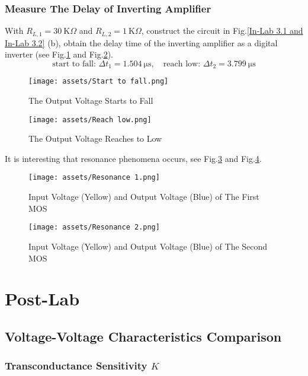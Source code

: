 \documentclass[UTF8]{report}
\def\KO{\ \mathrm{K}\Omega}
\theoremstyle{MyLineTheoremStyle} %
\theoremstyle{MyBlockTheoremStyle} %
\theoremstyle{MySubsubsectionStyle} %
\begin{document}
\subsubsection{Measure The Delay of Inverting Amplifier}
With $R_{L, 1} = 30 \KO$ and $R_{L, 2} = 1 \KO$, construct the circuit in Fig.\ref{In-Lab 3.1 and In-Lab 3.2} (b), obtain the delay time of the inverting amplifier as a digital inverter (see Fig.\ref{Starts to Fall} and Fig.\ref{Reaches to Low}).
\begin{equation}
\text{start to fall:\ \ } \Delta t_1 = 1.504 \ \mathrm{\mu s},\quad \text{reach low:\ \ } \Delta t_2 = 3.799 \ \mathrm{\mu s}
\end{equation}
\begin{figure}[H]\centering
    \texttt{[image: assets/Start to fall.png]}
    \caption{The Output Voltage Starts to Fall}
    \label{Starts to Fall}
\end{figure}
\begin{figure}[H]\centering
    \texttt{[image: assets/Reach low.png]}
    \caption{The Output Voltage Reaches to Low}
    \label{Reaches to Low}
\end{figure}

It is interesting that resonance phenomena occurs, see Fig.\ref{Resonance 1} and Fig.\ref{Resonance 2}.
\begin{figure}[H]\centering
    \texttt{[image: assets/Resonance 1.png]}
    \caption{Input Voltage (Yellow) and Output Voltage (Blue) of The First MOS}
    \label{Resonance 1}
\end{figure}
\begin{figure}[H]\centering
    \texttt{[image: assets/Resonance 2.png]}
    \caption{Input Voltage (Yellow) and Output Voltage (Blue) of The Second MOS}
    \label{Resonance 2}
\end{figure}

\section{Post-Lab}
\subsection{Voltage-Voltage Characteristics Comparison}
\subsubsection{Transconductance Sensitivity $K$}
\end{document}
